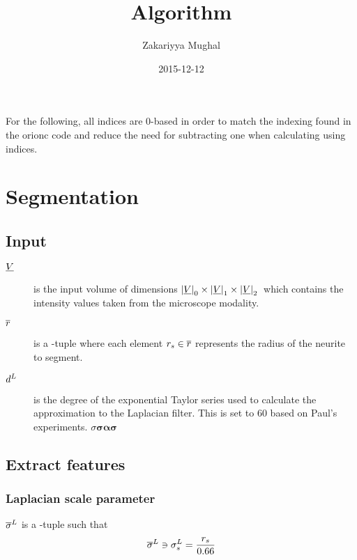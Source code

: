 \documentclass[12pt]{article}
\title{Algorithm}
\author{Zakariyya Mughal}
\date{2015-12-12}
\begin{document}
\maketitle
\tableofcontents

For the following, all indices are 0-based in order to match the
indexing found in the \gls{orionc} code and reduce the need for
subtracting one when calculating using indices.

\section{Segmentation}

\subsection{Input}

\newcommand{\foobar}[1]{\bm{#1}}

\begin{description}
	\item[\(\underline{V}{}\)] is the input volume of dimensions
		\(\left|\underline{V}\right|_0 \times \left|\underline{V}\right|_1 \times \left|\underline{V}\right|_2{}\) which contains the intensity values taken
		from the microscope modality.
	\item[\(\overline{r}{}\)] is a \Dim{\RadiiScalesName}-tuple where each element
		\(r_{s} \in \overline{r}\)
		represents the radius of the neurite to segment.
	\item[\(d^{L}{}\)] is the degree of the
		exponential Taylor series used to calculate the approximation
		to the Laplacian filter. This is set to \(\num{60}\) based on Paul's
		experiments. $\sigma {\boldsymbol{\sigma}} {\bm{\alpha}} {\bm{\sigma}}$

\end{description}

\subsection{Extract features}

\subsubsection{Laplacian scale parameter}

\(\overline{\sigma}^{L}\) is a \Dim{\RadiiScalesName}-tuple such that
\begin{equation*}
	\overline{\sigma}^{L} \ni \sigma^{L}_{s}{} = \frac{r_{s}{}}{\num{0.66}}
\end{equation*}
\end{document}
